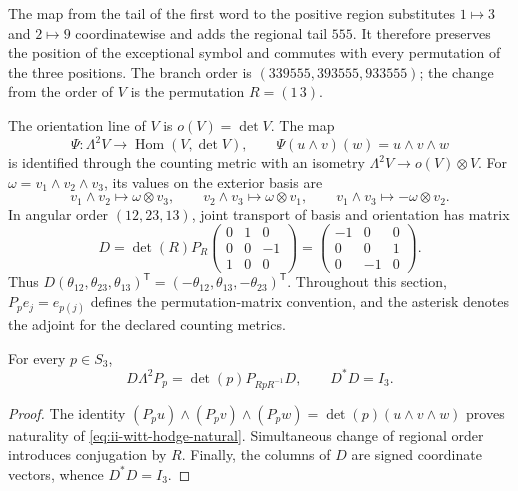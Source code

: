 The map from the tail of the first word to the positive region
substitutes \(1\mapsto3\) and \(2\mapsto9\) coordinatewise and adds
the regional tail \(555\). It therefore preserves the position of the
exceptional symbol and commutes with every permutation of the three positions. The
branch order is \((339555,393555,933555)\); the change from the order of
\(V\) is the permutation \(R=(1\,3)\).

The orientation line of \(V\) is \(o(V)=\det V\). The map
\begin{equation}
 \Psi:\Lambda^2V\longrightarrow\operatorname{Hom}(V,\det V),
 \qquad \Psi(u\wedge v)(w)=u\wedge v\wedge w
 \label{eq:ii-witt-hodge-natural}
\end{equation}
is identified through the counting metric with an isometry
\(\Lambda^2V\to o(V)\otimes V\). For
\(\omega=v_1\wedge v_2\wedge v_3\), its values on the exterior basis
are
\[
 v_1\wedge v_2\mapsto\omega\otimes v_3,
 \qquad v_2\wedge v_3\mapsto\omega\otimes v_1,
 \qquad v_1\wedge v_3\mapsto-\omega\otimes v_2.
\]
In angular order \((12,23,13)\), joint transport of basis and
orientation has matrix
\begin{equation}
 D=\det(R)P_R
 \begin{pmatrix}0&1&0\\0&0&-1\\1&0&0\end{pmatrix}
 =\begin{pmatrix}-1&0&0\\0&0&1\\0&-1&0\end{pmatrix}.
 \label{eq:ii-witt-orientation-D}
\end{equation}
Thus
\(D(\theta_{12},\theta_{23},\theta_{13})^{\mathsf T}
=(-\theta_{12},\theta_{13},-\theta_{23})^{\mathsf T}\).
Throughout this section, \(P_p e_j=e_{p(j)}\) defines the permutation-matrix
convention, and the asterisk denotes the adjoint for the declared
counting metrics.

\begin{proposition}
\label{prop:ii-witt-D-natural}
For every \(p\in S_3\),
\[
 D\Lambda^2P_p=\det(p)P_{RpR^{-1}}D,
 \qquad D^*D=I_3.
\]
\end{proposition}
\begin{proof}
The identity
\((P_pu)\wedge(P_pv)\wedge(P_pw)=\det(p)(u\wedge v\wedge w)\)
proves naturality of \eqref{eq:ii-witt-hodge-natural}. Simultaneous
change of regional order introduces conjugation by \(R\).
Finally, the columns of \(D\) are signed coordinate vectors,
whence \(D^*D=I_3\).
\end{proof}

